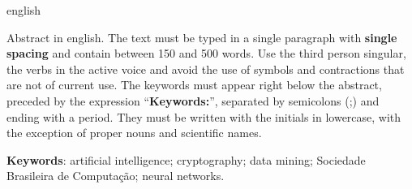 
\begin{resumo}[Abstract]
  \begin{otherlanguage*}{english}
    \begin{SingleSpace}
      Abstract in english. The text must be typed in a single paragraph with \textbf{single spacing} and contain between 150 and 500 words. Use the third person singular, the verbs in the active voice and avoid the use of symbols and contractions that are not of current use. The keywords must appear right below the abstract, preceded by the expression ``\textbf{Keywords:}'', separated by semicolons (;) and ending with a period. They must be written with the initials in lowercase, with the exception of proper nouns and scientific names.
    \end{SingleSpace}


    \vspace{\onelineskip}
    \textbf{Keywords}: artificial intelligence; cryptography; data mining; Sociedade Brasileira de Computação; neural networks.

  \end{otherlanguage*}
\end{resumo}
